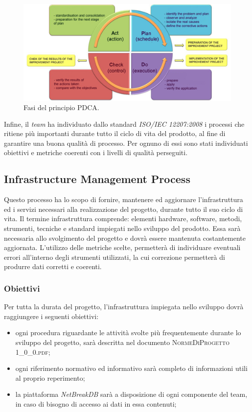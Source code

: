 	\begin{figure}[H]
		\centering
		\includegraphics[scale=0.6]{includes/img/pdca.png}
		\caption{Fasi del principio PDCA.}
	\end{figure}

	Infine, il \textit{team} ha individuato dallo standard \textit{ISO/IEC 12207:2008} i processi che ritiene più importanti durante tutto il ciclo di vita del prodotto, al fine di garantire una buona qualità di processo. Per ognuno di essi sono stati individuati obiettivi e metriche coerenti con i livelli di qualità perseguiti.
	
	\subsection{Infrastructure Management Process}
	Questo processo ha lo scopo di fornire, mantenere ed aggiornare l’infrastruttura ed i servizi necessari alla realizzazione del progetto, durante tutto il suo ciclo di vita. Il termine infrastruttura comprende: elementi hardware, software, metodi, strumenti, tecniche e standard impiegati nello sviluppo del prodotto.
	Essa sarà necessaria allo svolgimento del progetto e dovrà essere mantenuta costantemente aggiornata.
	L'utilizzo delle metriche scelte, permetterà di individuare eventuali errori all’interno degli strumenti utilizzati, la cui correzione permetterà di produrre dati corretti e coerenti.
		\subsubsection{Obiettivi}
		Per tutta la durata del progetto, l’infrastruttura impiegata nello sviluppo dovrà raggiungere i seguenti obiettivi:
		\begin{itemize}
			\item ogni procedura riguardante le attività svolte più frequentemente durante lo sviluppo del
			progetto, sarà descritta nel documento \textsc{NormeDiProgetto 1\_0\_0.pdf};
			\item ogni riferimento normativo ed informativo sarà completo di informazioni utili al proprio
			reperimento;
			\item la piattaforma \textit{NetBreakDB} sarà a disposizione di ogni componente del team, in caso di bisogno di accesso ai dati in essa contenuti;
		\end{itemize}
